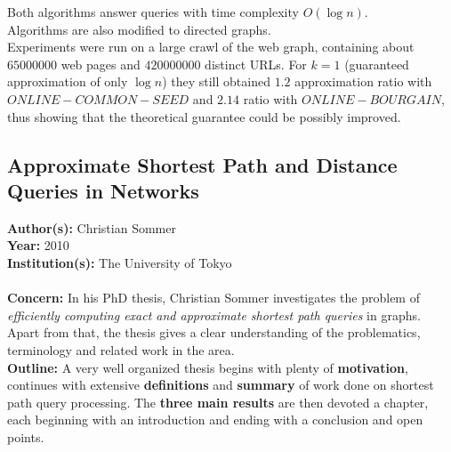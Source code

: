 \documentclass[a4paper]{article}
\newcommand{\textbff}[1]{{\large \textbf{#1}}}
\begin{document}
        Both algorithms answer queries with time complexity $O(\log n)$. \\

        Algorithms are also modified to directed graphs. \\

        Experiments were run on a large crawl of the web graph, containing about $65 000 000$ web pages and $420 000 000$ distinct URLs. For $k=1$ (guaranteed approximation of only $\log n$) they still obtained $1.2$ approximation ratio with $ONLINE-COMMON-SEED$ and $2.14$ ratio with $ONLINE-BOURGAIN$, thus showing that the theoretical guarantee could be possibly improved.

        \subsection{Approximate Shortest Path and Distance Queries in Networks}
        \label{subsec:sommerthesis}

        \textbff{Author(s): } Christian Sommer \\
        \textbff{Year: }2010 \\
        \textbff{Institution(s): } The University of Tokyo\\
        {\hfill}\\
        \textbff{Concern:} In his PhD thesis, Christian Sommer investigates the problem of \emph{efficiently computing exact and approximate shortest path queries} in graphs. Apart from that, the thesis gives a clear understanding of the problematics, terminology and related work in the area. \\

        \textbff{Outline:} A very well organized thesis begins with plenty of \textbf{motivation}, continues with extensive \textbf{definitions} and \textbf{summary} of work done on shortest path query processing. The \textbf{three main results} are then devoted a chapter, each beginning with an introduction and ending with a conclusion and open points.\\
\end{document}
